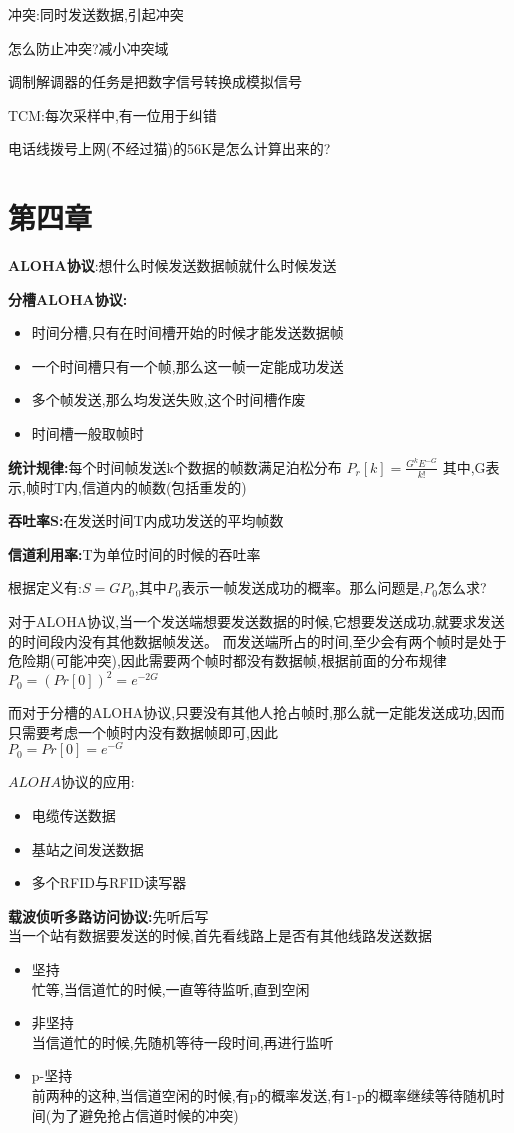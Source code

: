 \documentclass[UTF8,a4paper]{ctexart}
\begin{document}
  冲突:同时发送数据,引起冲突

  怎么防止冲突?减小冲突域

  调制解调器的任务是把数字信号转换成模拟信号

  TCM:每次采样中,有一位用于纠错

  电话线拨号上网(不经过猫)的56K是怎么计算出来的?

\section{第四章}
\textbf{ALOHA协议}:想什么时候发送数据帧就什么时候发送

\textbf{分槽ALOHA协议:}
\begin{itemize}
  \item 时间分槽,只有在时间槽开始的时候才能发送数据帧
  \item 一个时间槽只有一个帧,那么这一帧一定能成功发送
  \item 多个帧发送,那么均发送失败,这个时间槽作废
  \item 时间槽一般取帧时
\end{itemize}

\textbf{统计规律:}每个时间帧发送k个数据的帧数满足泊松分布
$P_r[k] = \frac{G^kE^{-G}}{k!}$
其中,G表示,帧时T内,信道内的帧数(包括重发的)

\textbf{吞吐率S:}在发送时间T内成功发送的平均帧数

\textbf{信道利用率:}T为单位时间的时候的吞吐率

根据定义有:$S = GP_0$,其中$P_0$表示一帧发送成功的概率。那么问题是,$P_0$怎么求?

对于ALOHA协议,当一个发送端想要发送数据的时候,它想要发送成功,就要求发送的时间段内没有其他数据帧发送。
而发送端所占的时间,至少会有两个帧时是处于危险期(可能冲突),因此需要两个帧时都没有数据帧,根据前面的分布规律\\
$P_0 = (Pr[0])^2 = e^{-2G}$

而对于分槽的ALOHA协议,只要没有其他人抢占帧时,那么就一定能发送成功,因而只需要考虑一个帧时内没有数据帧即可,因此\\
$P_0 = Pr[0] = e^{-G}$

$ALOHA$协议的应用:
\begin{itemize}
  \item 电缆传送数据
  \item 基站之间发送数据
  \item 多个RFID与RFID读写器
\end{itemize}

\textbf{载波侦听多路访问协议:}先听后写\\
当一个站有数据要发送的时候,首先看线路上是否有其他线路发送数据
\begin{itemize}
  \item 坚持\\
  忙等,当信道忙的时候,一直等待监听,直到空闲
  \item 非坚持\\
  当信道忙的时候,先随机等待一段时间,再进行监听
  \item p-坚持\\
  前两种的这种,当信道空闲的时候,有p的概率发送,有1-p的概率继续等待随机时间(为了避免抢占信道时候的冲突)
\end{itemize}
\end{document}
